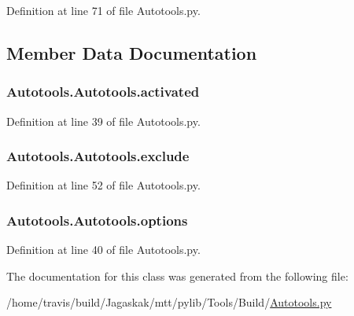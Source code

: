 Definition at line 71 of file Autotools.\-py.



\subsection{Member Data Documentation}
\hypertarget{classAutotools_1_1Autotools_a6bbb714a91bc8b6fe749326772b073b3}{
\subsubsection[{activated}]{\setlength{\rightskip}{0pt plus 5cm}Autotools.\-Autotools.\-activated}}\label{classAutotools_1_1Autotools_a6bbb714a91bc8b6fe749326772b073b3}


Definition at line 39 of file Autotools.\-py.

\hypertarget{classAutotools_1_1Autotools_aee37d9789ea22ee310ebc357cd721b7f}{
\subsubsection[{exclude}]{\setlength{\rightskip}{0pt plus 5cm}Autotools.\-Autotools.\-exclude}}\label{classAutotools_1_1Autotools_aee37d9789ea22ee310ebc357cd721b7f}


Definition at line 52 of file Autotools.\-py.

\hypertarget{classAutotools_1_1Autotools_a8b348e19f0a7104bde9c43c3a6ed695d}{
\subsubsection[{options}]{\setlength{\rightskip}{0pt plus 5cm}Autotools.\-Autotools.\-options}}\label{classAutotools_1_1Autotools_a8b348e19f0a7104bde9c43c3a6ed695d}


Definition at line 40 of file Autotools.\-py.



The documentation for this class was generated from the following file\-:\begin{DoxyCompactItemize}
\item 
/home/travis/build/\-Jagaskak/mtt/pylib/\-Tools/\-Build/\hyperlink{Autotools_8py}{Autotools.\-py}\end{DoxyCompactItemize}
